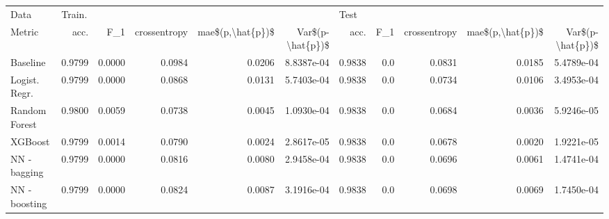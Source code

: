 \begin{tabular}{lrrrrrrrrrr}
\toprule
Data & \multicolumn{5}{l}{Train.} & \multicolumn{5}{l}{Test} \\
Metric &    acc. &     F\_1 & crossentropy & mae\$(p,\textbackslash hat\{p\})\$ & Var\$(p-\textbackslash hat\{p\})\$ &    acc. &  F\_1 & crossentropy & mae\$(p,\textbackslash hat\{p\})\$ & Var\$(p-\textbackslash hat\{p\})\$ \\
\midrule
Baseline      &  0.9799 &  0.0000 &       0.0984 &           0.0206 &       8.8387e-04 &  0.9838 &  0.0 &       0.0831 &           0.0185 &       5.4789e-04 \\
Logist. Regr. &  0.9799 &  0.0000 &       0.0868 &           0.0131 &       5.7403e-04 &  0.9838 &  0.0 &       0.0734 &           0.0106 &       3.4953e-04 \\
Random Forest &  0.9800 &  0.0059 &       0.0738 &           0.0045 &       1.0930e-04 &  0.9838 &  0.0 &       0.0684 &           0.0036 &       5.9246e-05 \\
XGBoost       &  0.9799 &  0.0014 &       0.0790 &           0.0024 &       2.8617e-05 &  0.9838 &  0.0 &       0.0678 &           0.0020 &       1.9221e-05 \\
NN - bagging  &  0.9799 &  0.0000 &       0.0816 &           0.0080 &       2.9458e-04 &  0.9838 &  0.0 &       0.0696 &           0.0061 &       1.4741e-04 \\
NN - boosting &  0.9799 &  0.0000 &       0.0824 &           0.0087 &       3.1916e-04 &  0.9838 &  0.0 &       0.0698 &           0.0069 &       1.7450e-04 \\
\bottomrule
\end{tabular}
